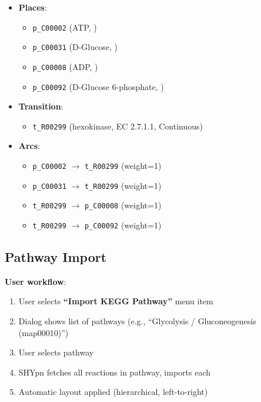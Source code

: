 \begin{itemize}
    \item \textbf{Places}:
    \begin{itemize}
        \item \texttt{p\_C00002} (ATP, )
        \item \texttt{p\_C00031} (D-Glucose, )
        \item \texttt{p\_C00008} (ADP, )
        \item \texttt{p\_C00092} (D-Glucose 6-phosphate, )
    \end{itemize}
    
    \item \textbf{Transition}:
    \begin{itemize}
        \item \texttt{t\_R00299} (hexokinase, EC 2.7.1.1, Continuous)
    \end{itemize}
    
    \item \textbf{Arcs}:
    \begin{itemize}
        \item \texttt{p\_C00002} $\to$ \texttt{t\_R00299} (weight=1)
        \item \texttt{p\_C00031} $\to$ \texttt{t\_R00299} (weight=1)
        \item \texttt{t\_R00299} $\to$ \texttt{p\_C00008} (weight=1)
        \item \texttt{t\_R00299} $\to$ \texttt{p\_C00092} (weight=1)
    \end{itemize}
\end{itemize}

\subsection{Pathway Import}
\label{subsec:pathway-import}

\textbf{User workflow}:

\begin{enumerate}
    \item User selects \textbf{``Import KEGG Pathway''} menu item
    \item Dialog shows list of pathways (e.g., ``Glycolysis / Gluconeogenesis (map00010)'')
    \item User selects pathway
    \item SHYpn fetches all reactions in pathway, imports each
    \item Automatic layout applied (hierarchical, left-to-right)
\end{enumerate}


